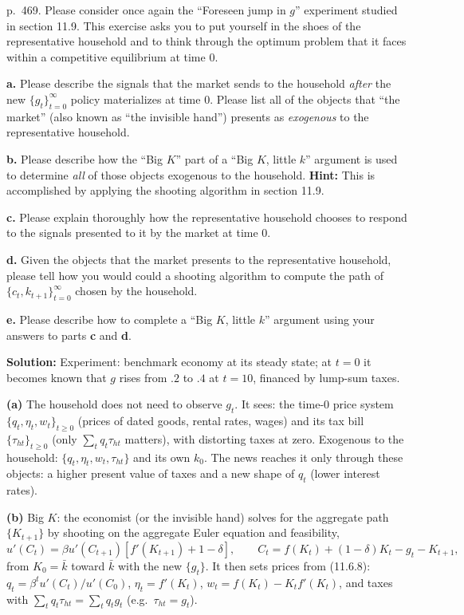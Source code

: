 \documentclass[12pt, letterpaper]{article}
\newcommand{\kb}{\bar k}
\begin{document}
\begin{tcolorbox}[oddbox,title={Exercise 11.19 \quad The invisible hand, I}]
\begin{tcolorbox}[questionbox]
p.~469. Please consider once again the ``Foreseen jump in $g$'' experiment studied in section 11.9. This exercise asks you
to put yourself in the shoes of the representative household and to think through the optimum problem that it faces
within a competitive equilibrium at time 0.

\textbf{a.} Please describe the signals that the market sends to the household \emph{after} the new
$\{g_t\}_{t=0}^\infty$ policy materializes at time 0. Please list all of the objects that ``the market'' (also known as
``the invisible hand'') presents as \emph{exogenous} to the representative household.

\textbf{b.} Please describe how the ``Big $K$'' part of a ``Big $K$, little $k$'' argument is used to determine
\emph{all} of those objects exogenous to the household. \textbf{Hint:} This is accomplished by applying the shooting
algorithm in section 11.9.

\textbf{c.} Please explain thoroughly how the representative household chooses to respond to the signals presented to it
by the market at time 0.

\textbf{d.} Given the objects that the market presents to the representative household, please tell how you would could a
shooting algorithm to compute the path of $\{c_t,k_{t+1}\}_{t=0}^\infty$ chosen by the household.

\textbf{e.} Please describe how to complete a ``Big $K$, little $k$'' argument using your answers to parts \textbf{c}
and \textbf{d}.
\end{tcolorbox}

\textbf{Solution:} Experiment: benchmark economy at its steady state; at $t=0$ it becomes known that $g$ rises from $.2$ to
$.4$ at $t=10$, financed by lump-sum taxes.

\textbf{(a)} The household does not need to observe $g_t$. It sees: the time-0 price system $\{q_t,\eta_t,w_t\}_{t\ge0}$
(prices of dated goods, rental rates, wages) and its tax bill $\{\tau_{ht}\}_{t\ge0}$ (only $\sum_tq_t\tau_{ht}$ matters),
with distorting taxes at zero. Exogenous to the household: $\{q_t,\eta_t,w_t,\tau_{ht}\}$ and its own $k_0$. The news
reaches it only through these objects: a higher present value of taxes and a new shape of $q_t$ (lower interest rates).

\textbf{(b)} Big $K$: the economist (or the invisible hand) solves for the aggregate path $\{K_{t+1}\}$ by shooting on the
aggregate Euler equation and feasibility,
\[
u'(C_t)=\beta u'(C_{t+1})[f'(K_{t+1})+1-\delta],\qquad C_t=f(K_t)+(1-\delta)K_t-g_t-K_{t+1},
\]
from $K_0=\kb$ toward $\kb$ with the new $\{g_t\}$. It then sets prices from (11.6.8):
$q_t=\beta^tu'(C_t)/u'(C_0)$, $\eta_t=f'(K_t)$, $w_t=f(K_t)-K_tf'(K_t)$, and taxes with
$\sum_tq_t\tau_{ht}=\sum_tq_tg_t$ (e.g.\ $\tau_{ht}=g_t$).


\end{tcolorbox}
\end{document}
